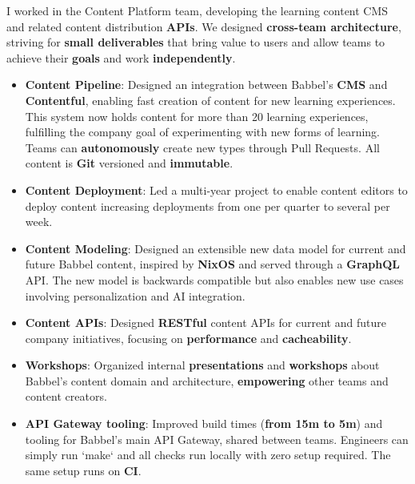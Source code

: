 \documentclass[10pt,a4paper,ragged2e,withhyper]{altacv}
\newcommand{\accentbold}[1]{\textbf{\textcolor{accent}{#1}}}
\begin{document}
\begin{paracol}{2}



{\RaggedRight
I worked in the Content Platform team, developing the learning content CMS and related content distribution \accentbold{APIs}. We designed \accentbold{cross-team architecture}, striving for \accentbold{small deliverables} that bring value to users and allow teams to achieve their \accentbold{goals} and work \accentbold{independently}.

\medskip

\begin{itemize}
\item \accentbold{Content Pipeline}: Designed an integration between Babbel's \accentbold{CMS} and \accentbold{Contentful}, enabling fast creation of content for new learning experiences. This system now holds content for more than 20 learning experiences, fulfilling the company goal of experimenting with new forms of learning. Teams can \accentbold{autonomously} create new types through Pull Requests. All content is \accentbold{Git} versioned and \accentbold{immutable}.
\item \accentbold{Content Deployment}: Led a multi-year project to enable content editors to deploy content increasing deployments from one per quarter to several per week.
\item \accentbold{Content Modeling}: Designed an extensible new data model for current and future Babbel content, inspired by \accentbold{NixOS} and served through a \accentbold{GraphQL} API. The new model is backwards compatible but also enables new use cases involving personalization and AI integration.
\item \accentbold{Content APIs}: Designed \accentbold{RESTful} content APIs for current and future company initiatives, focusing on \accentbold{performance} and \accentbold{cacheability}.
\item \accentbold{Workshops}: Organized internal \accentbold{presentations} and \accentbold{workshops} about Babbel's content domain and architecture, \accentbold{empowering} other teams and content creators.
\item \accentbold{API Gateway tooling}: Improved build times (\accentbold{from 15m to 5m}) and tooling for Babbel's main API Gateway, shared between teams. Engineers can simply run `make` and all checks run locally with zero setup required. The same setup runs on \accentbold{CI}.

\end{itemize}}
\end{paracol}
\end{document}
